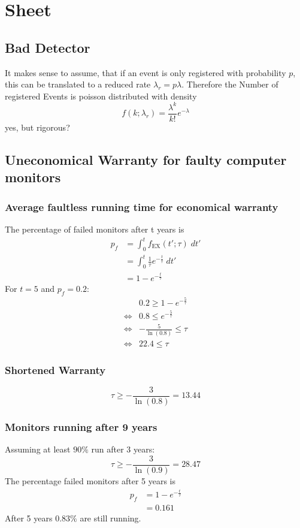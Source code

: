 \section{Sheet}
\subsection{Bad Detector}
It makes sense to assume, that if an event is only registered with
probability $p$, this can be translated to a reduced rate $\lambda_r = p\lambda$.
Therefore the Number of registered Events is poisson distributed with density
\begin{equation}
    f\left(k;\lambda_r\right)=\frac{\lambda^k}{k!}e^{-\lambda}
\end{equation}
{\color{red}yes, but rigorous?}
\subsection{Uneconomical Warranty for faulty computer monitors}
\subsubsection{Average faultless running time for economical warranty}
The percentage of failed monitors after t years is
\begin{align}
    p_f&=\int_0^t f_{\text{EX}}\left(t';\tau\right)\;dt'
    \\&= \int_0^t \frac{1}{\tau}e^{-\frac{t}{\tau}}\;dt'
    \\&=1-e^{-\frac{t}{\tau}}
\end{align}
For $t=5$ and $p_f = 0.2$:
\begin{align}
    &0.2\geq 1-e^{-\frac{5}{\tau}}
    \\\Leftrightarrow&0.8\leq e^{-\frac{5}{\tau}}
    \\\Leftrightarrow&-\frac{5}{\ln\left(0.8\right)}\leq \tau
    \\\Leftrightarrow&22.4\leq\tau
\end{align}
\subsubsection{Shortened Warranty}
\begin{equation}
    \tau\geq - \frac{3}{\ln\left(0.8\right)}=13.44
\end{equation}
\subsubsection{Monitors running after 9 years}
Assuming at least $90\%$ run after 3 years:
\begin{equation}
    \tau\geq -\frac{3}{\ln\left(0.9\right)}=28.47
\end{equation}
The percentage failed monitors after 5 years is
\begin{align}
    p_f&=1-e^{-\frac{t}{\tau}}
    \\&=0.161
\end{align}
After 5 years $0.83\%$ are still running.
